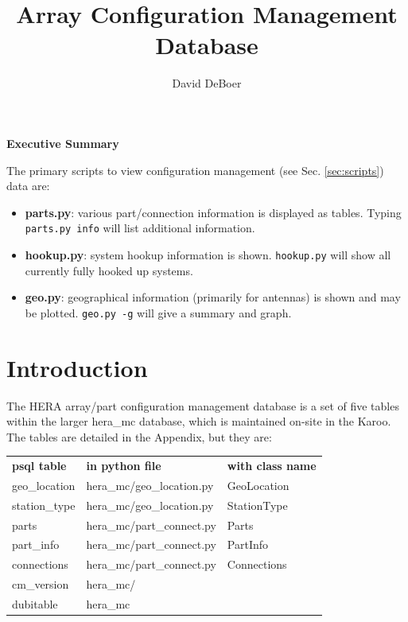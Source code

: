 \documentclass{article}[10pt]
\begin{document}
\author{David DeBoer}
\title{Array Configuration Management Database}
\maketitle

\noindent
{\bf Executive Summary}

\noindent
The primary scripts to view configuration management (see Sec. \ref{sec:scripts}) data are:
\begin{itemize}
\item {\bf parts.py}:  various part/connection information is displayed as tables.  Typing {\tt parts.py info} will list additional information.
\item {\bf hookup.py}:  system hookup information is shown.  {\tt hookup.py} will show all currently fully hooked up systems.
\item {\bf geo.py}:  geographical information (primarily for antennas) is shown and may be plotted.  {\tt geo.py -g} will give a summary and graph.
\end{itemize}

\section{Introduction}
The HERA array/part configuration management database is a set of five tables within the larger hera\_mc database, which is maintained on-site in the Karoo.  The tables are detailed in the Appendix, 
but they are: 

\begin{center}
\begin{tabular}{l l l}
         {\bf psql table} & {\bf in python file}  &  {\bf with class name} \\
	geo\_location 	& hera\_mc/geo\_location.py & GeoLocation \\
	station\_type 	& hera\_mc/geo\_location.py & StationType \\
	parts 	& hera\_mc/part\_connect.py & Parts \\
	part\_info 	         & hera\_mc/part\_connect.py & PartInfo \\
	connections 	& hera\_mc/part\_connect.py & Connections \\
	cm\_version      & hera\_mc/ & \\
	dubitable          & hera\_mc & \\
\end{tabular}
\end{center}
\end{document}
